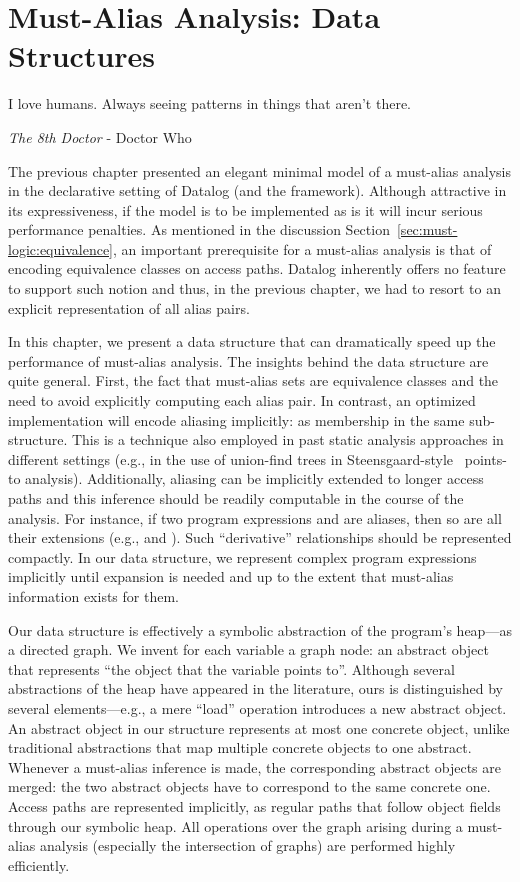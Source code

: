 \chapter{Must-Alias Analysis: Data Structures}
\label{chapter:must-data}
\epigraph{I love humans. Always seeing patterns in things that aren’t there.}{\textit{The 8th Doctor} - Doctor Who}

The previous chapter presented an elegant minimal model of a must-alias analysis in the declarative setting of Datalog (and the \doop{} framework). Although attractive in its expressiveness, if the model is to be implemented as is it will incur serious performance penalties. As mentioned in the discussion Section~\ref{sec:must-logic:equivalence}, an important prerequisite for a must-alias analysis is that of encoding equivalence classes on access paths. Datalog inherently offers no feature to support such notion and thus, in the previous chapter, we had to resort to an explicit representation of all alias pairs.

In this chapter, we present a data structure that can dramatically speed up the performance of must-alias analysis. The insights behind the data structure are quite general. First, the fact that must-alias sets are equivalence classes and the need to avoid explicitly computing each alias pair. In contrast, an optimized implementation will encode aliasing implicitly: as membership in the same sub-structure. This is a technique also employed in past static analysis approaches in different settings (e.g., in the use of union-find trees in Steensgaard-style~\cite{popl:1996:Steensgaard} points-to analysis). Additionally, aliasing can be implicitly extended to longer access paths and this inference should be readily computable in the course of the analysis. For instance, if two program expressions  and  are aliases, then so are all their extensions (e.g.,  and ). Such ``derivative'' relationships should be represented compactly. In our data structure, we represent complex program expressions implicitly until expansion is needed and up to the extent that must-alias information exists for them.

Our data structure is effectively a symbolic abstraction of the program's heap---as a directed graph. We invent for each variable a graph node: an abstract object that represents ``the object that the variable points to''. Although several abstractions of the heap have appeared in the literature, ours is distinguished by several elements---e.g., a mere ``load'' operation introduces a new abstract object. An abstract object in our structure represents at most one concrete object, unlike traditional abstractions that map multiple concrete objects to one abstract. Whenever a must-alias inference is made, the corresponding abstract objects are merged: the two abstract objects have to correspond to the same concrete one. Access paths are represented implicitly, as regular paths that follow object fields through our symbolic heap. All operations over the graph arising during a must-alias analysis (especially the intersection of graphs) are performed highly efficiently.


